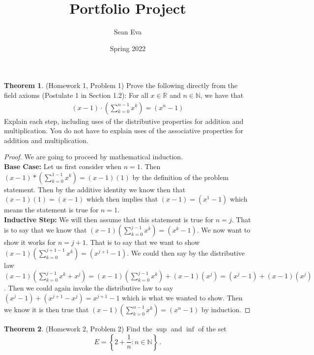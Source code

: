 \documentclass{article}
\title{Portfolio Project}
\author{Sean Eva}
\date{Spring 2022}
\theoremstyle{definition}
\newtheorem{theorem}{Theorem}
\newcommand{\N}{\mathbb{N}}
\newcommand{\R}{\mathbb{R}}
\begin{document}
\maketitle

\pagebreak
\begin{theorem}
(Homework 1, Problem 1) Prove the following directly from the field axioms (Postulate 1 in Section 1.2): For all $x \in \R$ and $n \in \N$, we have that
\begin{align}\label{eq:geometricSeries}
(x - 1) \cdot \left(  \sum_{k = 0}^{n-1} x^k \right) = (x^n - 1)
\end{align}
Explain each step, including uses of the distributive properties for addition and multiplication. You do not have to explain uses of the associative properties for addition and multiplication.
\end{theorem}

\begin{proof}
We are going to proceed by mathematical induction.\\
\textbf{Base Case:} Let us first consider when $n=1.$ Then $(x-1)*(\sum_{k=0}^{1-1}x^k) = (x-1)(1)$ by the definition of the problem statement. Then by the additive identity we know then that $(x-1)(1) = (x-1)$ which then implies that $(x-1) = (x^1-1)$ which means the statement is true for $n=1.$\\
\textbf{Inductive Step:} We will then assume that this statement is true for $n=j.$ That is to say that we know that $(x-1)(\sum_{k=0}^{j-1}x^k) = (x^k-1).$ We now want to show it works for $n=j+1$. That is to say that we want to show $(x-1)(\sum_{k=0}^{j+1-1}x^k) = (x^{j+1}-1)$. We could then say by the distributive law $(x-1)(\sum_{k=0}^{j-1}x^k+x^j) = (x-1)(\sum_{k=0}^{j-1}x^k)+(x-1)(x^j) = (x^j-1)+(x-1)(x^j)$. Then we could again invoke the distributive law to say $(x^j-1)+(x^{j+1}-x^j) = x^{j+1}-1$ which is what we wanted to show. Then we know it is then true that $(x-1)(\sum_{k=0}^{n-1}x^k) = (x^n-1)$ by induction.
\end{proof}

\pagebreak
\begin{theorem}
(Homework 2, Problem 2) Find the $\sup$ and $\inf$ of the set 
\[
E = \left\{ 2 + \frac{1}{n} : n \in \N \right\} \,. 
\]
\end{theorem}
\end{document}
